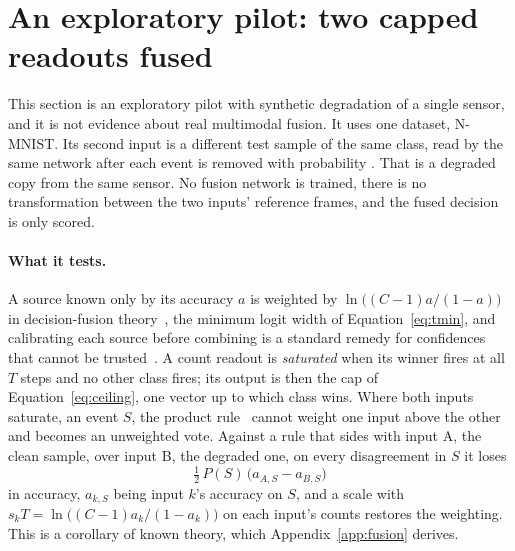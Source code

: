 \section{An exploratory pilot: two capped readouts fused}
\label{sec:fusion}

This section is an exploratory pilot with synthetic degradation of a single sensor, and it is not
evidence about real multimodal fusion. It uses one dataset, N-MNIST. Its second input is a
different test sample of the same class, read by the same network after each event is removed
with probability \fuRate. That is a degraded copy from the same sensor. No %
fusion network is trained, there is no transformation between the two inputs' reference frames,
and the fused decision is only scored.

\paragraph{What it tests.}
A source known only by its accuracy $a$ is weighted by $\ln\big((C-1)a/(1-a)\big)$ in
decision-fusion theory~\citep{shapley1984optimizing,kuncheva2014weighted,li2014error}, the %
minimum logit width of Equation~\eqref{eq:tmin}, and calibrating each source before combining is
a standard remedy for confidences that cannot be trusted~\citep{brummer2007fusion,kumar2022calibrated}. %
A count readout is \emph{saturated} when its winner fires at all $T$ steps and no other class
fires; its output is then the cap of Equation~\eqref{eq:ceiling}, one vector up to which class
wins. Where both inputs saturate, an event $S$, the product rule~\citep{kittler1998combining} %
cannot weight one input above the other and becomes an unweighted vote. Against a rule that sides
with input A, the clean sample, over input B, the degraded one, on every disagreement in $S$ it loses
\begin{equation}
\tfrac12\,P(S)\,\big(a_{A,S}-a_{B,S}\big)
\label{eq:fusioncost}
\end{equation}
in accuracy, $a_{k,S}$ being input $k$'s accuracy on $S$, and a scale with
$s_kT=\ln\big((C-1)a_k/(1-a_k)\big)$ on each input's counts restores the weighting. This is a
corollary of known theory, which Appendix~\ref{app:fusion} derives.


